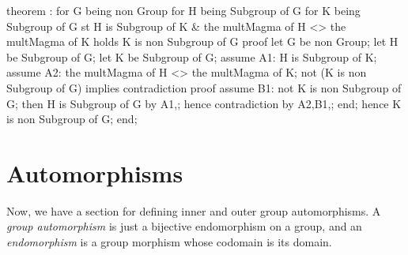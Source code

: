 \nwenddocs{}\endmoddef\nwstartdeflinemarkup{}\nwenddeflinemarkup
theorem :
  for G being non  Group
  for H being  Subgroup of G
  for K being Subgroup of G
  st H is Subgroup of K & the multMagma of H <> the multMagma of K
  holds K is non  Subgroup of G
proof
  let G be non  Group;
  let H be  Subgroup of G;
  let K be Subgroup of G;
  assume A1: H is Subgroup of K;
  assume A2: the multMagma of H <> the multMagma of K;
  not (K is non  Subgroup of G) implies contradiction
  proof
    assume B1: not K is non  Subgroup of G;
    then H is  Subgroup of G by A1,;
    hence contradiction by A2,B1,;
  end;
  hence K is non  Subgroup of G;
end;
\eatline
{}\nwendcode{}%
\section{Automorphisms}\label{sec:characteristic:automorphism}
Now, we have a section for defining inner and outer group
automorphisms. A \emph{group automorphism} is just a bijective endomorphism on
a group, and an \emph{endomorphism} is a group morphism whose codomain
is its domain.

